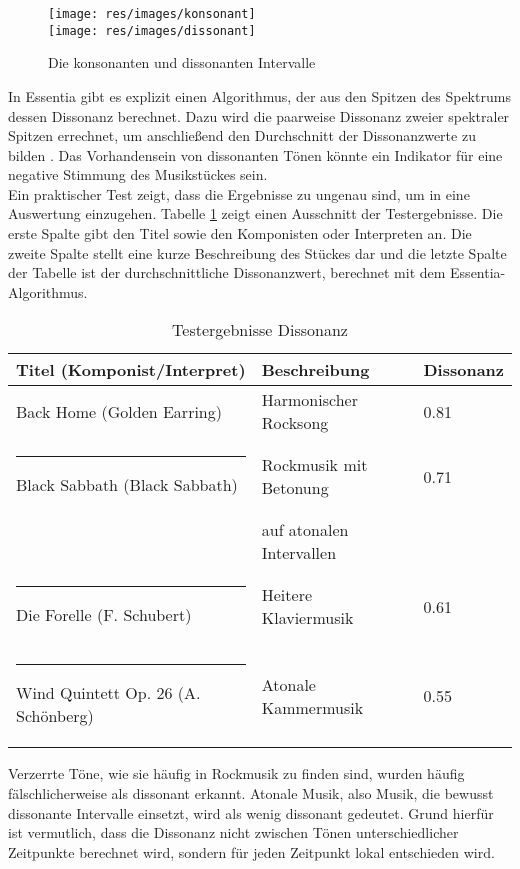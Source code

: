 \documentclass[11pt,a4paper]{article}
\begin{document}
\begin{figure}[ht]
\centering
\texttt{[image: res/images/konsonant]}
\vspace{5pt}\\
\texttt{[image: res/images/dissonant]}
\caption[Konsonante und Dissonante Intervalle]{Die konsonanten und dissonanten Intervalle \cite{89a5aac0af37ff45f55cd59468ed3b0a5f30cbb229bb691b7970477c14dbe1af}}
\label{fig:KonDisIntervalle}
\end{figure}
\noindent
In Essentia gibt es explizit einen Algorithmus, der aus den Spitzen des Spektrums dessen Dissonanz berechnet. Dazu wird die paarweise Dissonanz zweier spektraler Spitzen errechnet, um anschließend den Durchschnitt der Dissonanzwerte zu bilden \cite{EssentiaDissonance}. Das Vorhandensein von dissonanten Tönen könnte ein Indikator für eine negative Stimmung des Musikstückes sein.\\
Ein praktischer Test zeigt, dass die Ergebnisse zu ungenau sind, um in eine Auswertung einzugehen. Tabelle \ref{tab:DissonanzTestergebnisse} zeigt einen Ausschnitt der Testergebnisse. Die erste Spalte gibt den Titel sowie den Komponisten oder Interpreten an. Die zweite Spalte stellt eine kurze Beschreibung des Stückes dar und die letzte Spalte der Tabelle ist der durchschnittliche Dissonanzwert, berechnet mit dem Essentia-Algorithmus.
\begin{table}[!ht]
\centering
\begin{tabular}{l | l | l}
\textbf{Titel (Komponist/Interpret)} & \textbf{Beschreibung} & \textbf{Dissonanz} \\
\hline
Back Home (Golden Earring) & Harmonischer Rocksong & 0.81 \\
\rule{-3pt}{3ex}
Black Sabbath (Black Sabbath) & Rockmusik mit Betonung & 0.71 \\
 &  auf atonalen Intervallen & \\
 \rule{-3pt}{3ex}
Die Forelle (F. Schubert) & Heitere Klaviermusik & 0.61 \\
\rule{-3pt}{3ex}
Wind Quintett Op. 26 (A. Schönberg) & Atonale Kammermusik & 0.55 \\
\end{tabular}
\caption[Testergebnisse Dissonanz]{Testergebnisse Dissonanz}
\label{tab:DissonanzTestergebnisse}
\end{table}
\noindent
Verzerrte Töne, wie sie häufig in Rockmusik zu finden sind, wurden häufig fälschlicherweise als dissonant erkannt. Atonale Musik, also Musik, die bewusst dissonante Intervalle einsetzt, wird als wenig dissonant gedeutet. Grund hierfür ist vermutlich, dass die Dissonanz nicht zwischen Tönen unterschiedlicher Zeitpunkte berechnet wird, sondern für jeden Zeitpunkt lokal entschieden wird.
\end{document}
